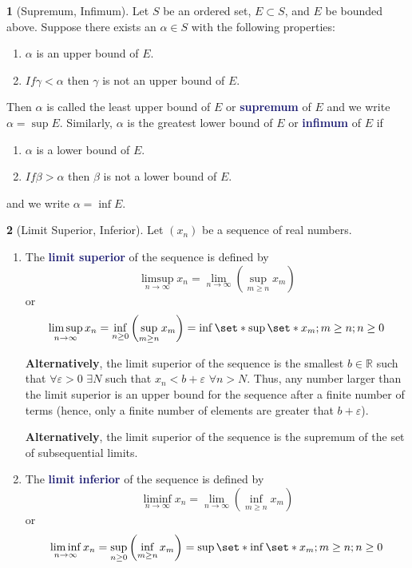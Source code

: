 \documentclass[12pt]{article}
\numberwithin{equation}{section}
\newcommand{\navy}[1]{\textcolor{MidnightBlue}{\bf #1}}
\theoremstyle{plain}
\theoremstyle{definition}
\newtheorem{definition}{\color{MidnightBlue}{\textbf{Definition}}}[section]
\newcommand\parens[1]{\left( #1 \right)}
\def\Set{\set*}%
\newcommand{\1}{\mathbbm 1}
\newcommand{\e}{\varepsilon}
\newcommand{\RR}{\mathbb R}
\begin{document}
\begin{definition}[Supremum, Infimum]
Let $S$ be an ordered set, $E \subset S$, and $E$ be bounded above. Suppose there exists an $\alpha \in S$ with the following properties:
\begin{enumerate}
\item $\alpha$ is an upper bound of $E$.
\item $If \gamma < \alpha$ then $\gamma$ is not an upper bound of $E$.
\end{enumerate}
Then $\alpha$ is called the least upper bound of $E$ or \navy{supremum} of $E$ and we write $\alpha = \sup E$. Similarly, $\alpha$ is the greatest lower bound of $E$ or \navy{infimum} of $E$ if
\begin{enumerate}
\item $\alpha$ is a lower bound of $E$.
\item $If \beta > \alpha$ then $\beta$ is not a lower bound of $E$.
\end{enumerate}
and we write $\alpha = \inf E$.
\end{definition}

\begin{definition}[Limit Superior, Inferior]
Let $\parens{x_n}$ be a sequence of real numbers.

\begin{enumerate}
\item The \navy{limit superior} of the sequence is defined by
\begin{equation}
\limsup\limits_{n \to \infty} x_n = \lim_{n \to \infty}\parens{\sup_{m \geq n} x_m}
\end{equation}
or
\begin{equation}
\limsup\limits_{n \to \infty} x_n = \inf_{n \geq 0} \parens{\sup_{m \geq n} x_m} = \inf\Set{\sup \Set{x_m; m \geq n}; n \geq 0}
\end{equation}

\textbf{Alternatively}, the limit superior of the sequence is the smallest $b \in \RR$ such that $\forall \e > 0$ $\exists N$ such that $x_n < b + \e$ $\forall n > N$. Thus, any number larger than the limit superior is an upper bound for the sequence after a finite number of terms (hence, only a finite number of elements are greater that $b + \e$).

\textbf{Alternatively}, the limit superior of the sequence is the supremum of the set of subsequential limits.

\item The \navy{limit inferior} of the sequence is defined by
\begin{equation}
\liminf\limits_{n \to \infty} x_n = \lim_{n \to \infty}\parens{\inf_{m \geq n} x_m}
\end{equation}
or
\begin{equation}
\liminf\limits_{n \to \infty} x_n = \sup_{n \geq 0} \parens{\inf_{m \geq n} x_m} = \sup\Set{\inf \Set{x_m; m \geq n}; n \geq 0}
\end{equation}
\end{enumerate}

\end{definition}
\end{document}
